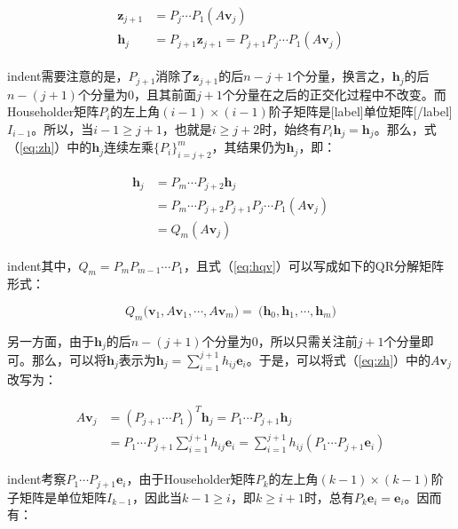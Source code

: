\documentclass[UTF8,nofonts]{ctexart}
\begin{document}
\begin{align}
\label{eq:zh}
\begin{split}
\boldsymbol{z}_{j+1} &= P_j\cdots P_1(A\boldsymbol{v}_j) \\
\boldsymbol{h}_j &= P_{j+1}\boldsymbol{z}_{j+1}=P_{j+1}P_j\cdots P_1(A\boldsymbol{v}_j)
\end{split}
\end{align}

indent需要注意的是，$P_{j+1}$消除了$\boldsymbol{z}_{j+1}$的后$n-{j+1}$个分量，换言之，$\boldsymbol{h}_j$的后$n-(j+1)$个分量为$0$，且其前面$j+1$个分量在之后的正交化过程中不改变。而Householder矩阵$P_i$的左上角$(i-1)\times(i-1)$阶子矩阵是[label]单位矩阵[/label]$I_{i-1}$。所以，当$i-1\geq j+1$，也就是$i\geq j+2$时，始终有$P_i\boldsymbol{h}_j=\boldsymbol{h}_j$。那么，式（\ref{eq:zh}）中的$\boldsymbol{h}_j$连续左乘$\{P_i\}_{i=j+2}^m$，其结果仍为$\boldsymbol{h}_j$，即：

\begin{align}
\label{eq:hqv}
\begin{split}
\boldsymbol{h}_j&=P_m\cdots P_{j+2}\boldsymbol{h}_j \\
&=P_m\cdots P_{j+2}P_{j+1}P_j\cdots P_1(A\boldsymbol{v}_j) \\
&=Q_m(A\boldsymbol{v}_j)
\end{split}
\end{align}

indent其中，$Q_m=P_mP_{m-1}\cdots P_1$，且式（\ref{eq:hqv}）可以写成如下的QR分解矩阵形式：

\[
Q_m\big(\boldsymbol{v}_1,A\boldsymbol{v}_1,\cdots,A\boldsymbol{v}_m\big)=\
\big(\boldsymbol{h}_0,\boldsymbol{h}_1,\cdots,\boldsymbol{h}_m\big)
\]

另一方面，由于$\boldsymbol{h}_j$的后$n-(j+1)$个分量为$0$，所以只需关注前$j+1$个分量即可。那么，可以将$\boldsymbol{h}_j$表示为$\boldsymbol{h}_j=\sum_{i=1}^{j+1}h_{ij}\boldsymbol{e}_i$。于是，可以将式（\ref{eq:zh}）中的$A\boldsymbol{v}_j$改写为：

\begin{align}
\label{eq:avq}
\begin{split}
A\boldsymbol{v}_j&=(P_{j+1}\cdots P_1)^T\boldsymbol{h}_j=P_1\cdots P_{j+1}\boldsymbol{h}_j \\
&=P_1\cdots P_{j+1}\sum_{i=1}^{j+1}h_{ij}\boldsymbol{e}_i=\sum_{i=1}^{j+1}h_{ij}\left(P_1\cdots P_{j+1}\boldsymbol{e}_i\right)
\end{split}
\end{align}

indent考察$P_1\cdots P_{j+1}\boldsymbol{e}_i$，由于Householder矩阵$P_k$的左上角$(k-1)\times(k-1)$阶子矩阵是单位矩阵$I_{k-1}$，因此当$k-1 \geq i$，即$k \geq i+1$时，总有$P_k\boldsymbol{e}_i=\boldsymbol{e}_i$。因而有：
\end{document}
